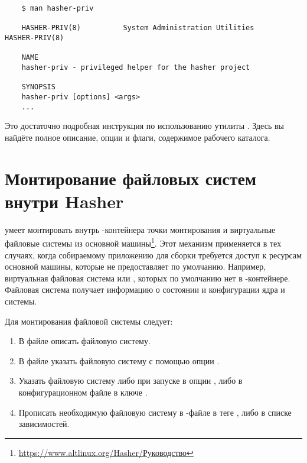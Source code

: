 \begin{verbatim}
	$ man hasher-priv
	
	HASHER-PRIV(8)          System Administration Utilities         HASHER-PRIV(8)
	
	NAME
	hasher-priv - privileged helper for the hasher project
	
	SYNOPSIS
	hasher-priv [options] <args>
	...
\end{verbatim}

Это достаточно подробная инструкция по использованию утилиты . Здесь вы найдёте полное описание, опции и флаги, содержимое рабочего каталога. 


\hypertarget{1.3}{\section{Монтирование файловых систем внутри Hasher}}
 умеет монтировать внутрь -контейнера точки монтирования и виртуальные файловые системы из основной машины\footnote{\href{https://www.altlinux.org/Hasher/\%D0\%A0\%D1\%83\%D0\%BA\%D0\%BE\%D0\%B2\%D0\%BE\%D0\%B4\%D1\%81\%D1\%82\%D0\%B2\%D0\%BE\#\%D0\%9C\%D0\%BE\%D0\%BD\%D1\%82\%D0\%B8\%D1\%80\%D0\%BE\%D0\%B2\%D0\%B0\%D0\%BD\%D0\%B8\%D0\%B5_\%D1\%84\%D0\%B0\%D0\%B9\%D0\%BB\%D0\%BE\%D0\%B2\%D1\%8B\%D1\%85_\%D1\%81\%D0\%B8\%D1\%81\%D1\%82\%D0\%B5\%D0\%BC_\%D0\%B2\%D0\%BD\%D1\%83\%D1\%82\%D1\%80\%D0\%B8_hasher}{https://www.altlinux.org/Hasher/Руководство}}. Этот механизм применяется в тех случаях, когда собираемому приложению для сборки требуется доступ к ресурсам основной машины, которые  не предоставляет по умолчанию. Например, виртуальная файловая система  или , которых по умолчанию нет в -контейнере. Файловая система  получает информацию о состоянии и конфигурации ядра и системы.

Для монтирования файловой системы следует:
\begin{enumerate}
	\item В файле  описать файловую систему.
	\item В файле  указать файловую систему с помощью опции .
	\item Указать файловую систему либо при запуске  в опции , либо в конфигурационном файле  в ключе .
	\item Прописать необходимую файловую систему в -файле в теге , либо в списке зависимостей.
\end{enumerate} 